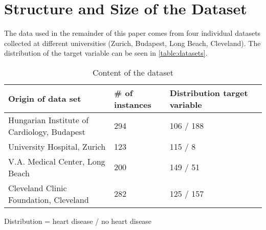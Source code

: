 \section{Structure and Size of the Dataset} \label{sec:dataUnderstanding}


The data used in the remainder of this paper comes from four individual datasets collected at different universities (Zurich, Budapest, Long Beach, Cleveland). The distribution of the target variable can be seen in \vref{table:datasets}.
\begin{table}[h]

    \begin{footnotesize}
        \begin{tabular}{|l|l|l|l|}
            \hline
            \textbf{Origin of data set}              & \textbf{\# of instances} & \textbf{Distribution target variable} \\ \hline
            Hungarian Institute of Cardiology, Budapest & 294                      & 106 / 188                             \\ \hline
            University Hospital, Zurich                 & 123                      & 115 / 8                               \\ \hline
            V.A. Medical Center, Long Beach             & 200                      & 149 / 51                              \\ \hline
            Cleveland Clinic Foundation, Cleveland      & 282                      & 125 / 157                             \\ \hline
        \end{tabular}
    \end{footnotesize}
    \begin{center}
        \centering
        Distribution = heart disease / no heart disease
    \end{center}
    \caption{Content of the dataset}
    \label{table:datasets}
\end{table}



